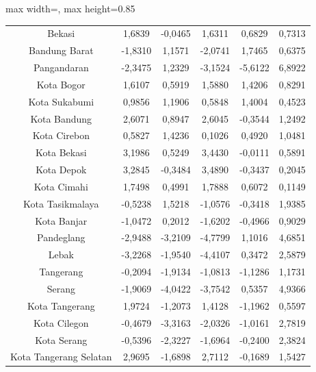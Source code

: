 \begin{table}[H]
\begin{adjustbox}{max width=\textwidth, max height=0.85\textheight}
\begin{tabular}{|c|c|c|c|c|c|}
Bekasi & 1,6839 & -0,0465 & 1,6311 & 0,6829 & 0,7313 \\
Bandung Barat & -1,8310 & 1,1571 & -2,0741 & 1,7465 & 0,6375 \\
Pangandaran & -2,3475 & 1,2329 & -3,1524 & -5,6122 & 6,8922 \\
Kota Bogor & 1,6107 & 0,5919 & 1,5880 & 1,4206 & 0,8291 \\
Kota Sukabumi & 0,9856 & 1,1906 & 0,5848 & 1,4004 & 0,4523 \\
Kota Bandung & 2,6071 & 0,8947 & 2,6045 & -0,3544 & 1,2492 \\
Kota Cirebon & 0,5827 & 1,4236 & 0,1026 & 0,4920 & 1,0481 \\
Kota Bekasi & 3,1986 & 0,5249 & 3,4430 & -0,0111 & 0,5891 \\
Kota Depok & 3,2845 & -0,3484 & 3,4890 & -0,3437 & 0,2045 \\
Kota Cimahi & 1,7498 & 0,4991 & 1,7888 & 0,6072 & 0,1149 \\
Kota Tasikmalaya & -0,5238 & 1,5218 & -1,0576 & -0,3418 & 1,9385 \\
Kota Banjar & -1,0472 & 0,2012 & -1,6202 & -0,4966 & 0,9029 \\
Pandeglang & -2,9488 & -3,2109 & -4,7799 & 1,1016 & 4,6851 \\
Lebak & -3,2268 & -1,9540 & -4,4107 & 0,3472 & 2,5879 \\
Tangerang & -0,2094 & -1,9134 & -1,0813 & -1,1286 & 1,1731 \\
Serang & -1,9069 & -4,0422 & -3,7542 & 0,5357 & 4,9366 \\
Kota Tangerang & 1,9724 & -1,2073 & 1,4128 & -1,1962 & 0,5597 \\
Kota Cilegon & -0,4679 & -3,3163 & -2,0326 & -1,0161 & 2,7819 \\
Kota Serang & -0,5396 & -2,3227 & -1,6964 & -0,2400 & 2,3824 \\
Kota Tangerang Selatan & 2,9695 & -1,6898 & 2,7112 & -0,1689 & 1,5427 \\
\hline
\end{tabular}
\end{adjustbox}
\end{table}